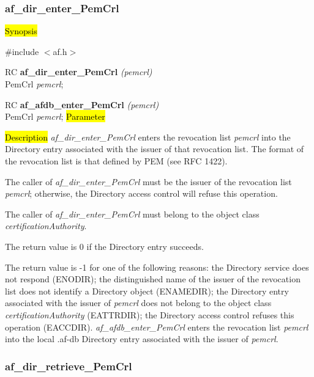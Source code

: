 \subsubsection{af\_dir\_enter\_PemCrl}

\hl{Synopsis}

\#include $<$af.h$>$

RC {\bf af\_dir\_enter\_PemCrl} {\em (pemcrl)} \\
PemCrl {\em *pemcrl};

RC {\bf af\_afdb\_enter\_PemCrl} {\em (pemcrl)} \\
PemCrl {\em *pemcrl};
\hl{Parameter}

\hl{Description}
{\em af\_dir\_enter\_PemCrl} enters the revocation list {\em pemcrl} into 
the Directory entry associated with the issuer of that revocation list.
The format of the revocation list is that defined by PEM (see RFC 1422).

The caller of {\em af\_dir\_enter\_PemCrl} must be the issuer of the revocation list
{\em pemcrl}; otherwise, the Directory access control will 
refuse this operation.

The caller of {\em af\_dir\_enter\_PemCrl} must belong to the object class 
{\em certificationAuthority}.

The return value is 0 if the Directory entry succeeds.

The return value is -1 for one of the following reasons:
\bi
\m the Directory service does not respond (ENODIR);
\m the distinguished name of the issuer of the revocation list does not identify a Directory 
object (ENAMEDIR);
\m the Directory entry associated with the issuer of {\em pemcrl} does not belong to the
object class {\em certificationAuthority} (EATTRDIR);
\m the Directory access control refuses this operation (EACCDIR).
\ei
{\em af\_afdb\_enter\_PemCrl} enters the revocation list {\em pemcrl} 
into the local .af-db Directory entry associated with the issuer of {\em pemcrl}.



\subsubsection{af\_dir\_retrieve\_PemCrl}

